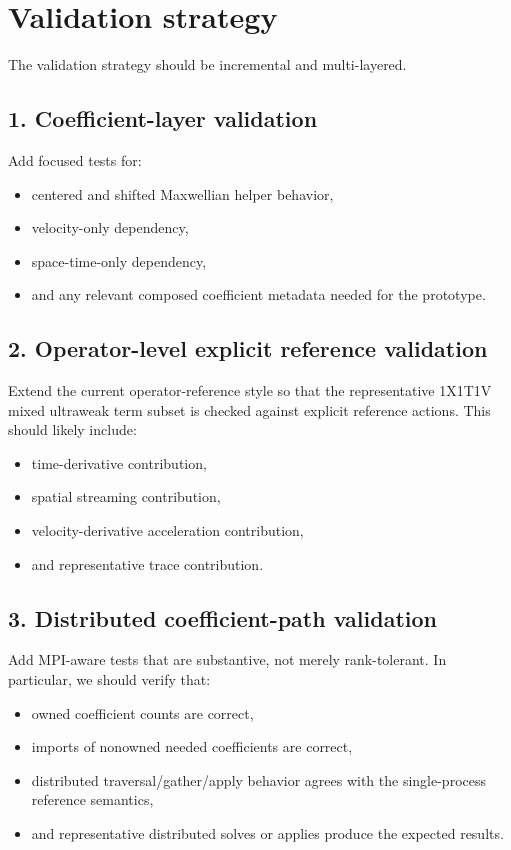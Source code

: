 \documentclass[11pt]{article}
\begin{document}
\section{Validation strategy}

The validation strategy should be incremental and multi-layered.

\subsection{1. Coefficient-layer validation}

Add focused tests for:
\begin{itemize}[leftmargin=2em]
\item centered and shifted Maxwellian helper behavior,
\item velocity-only dependency,
\item space-time-only dependency,
\item and any relevant composed coefficient metadata needed for the prototype.
\end{itemize}

\subsection{2. Operator-level explicit reference validation}

Extend the current operator-reference style so that the representative 1X1T1V mixed ultraweak term subset is checked against explicit reference actions. This should likely include:
\begin{itemize}[leftmargin=2em]
\item time-derivative contribution,
\item spatial streaming contribution,
\item velocity-derivative acceleration contribution,
\item and representative trace contribution.
\end{itemize}

\subsection{3. Distributed coefficient-path validation}

Add MPI-aware tests that are substantive, not merely rank-tolerant. In particular, we should verify that:
\begin{itemize}[leftmargin=2em]
\item owned coefficient counts are correct,
\item imports of nonowned needed coefficients are correct,
\item distributed traversal/gather/apply behavior agrees with the single-process reference semantics,
\item and representative distributed solves or applies produce the expected results.
\end{itemize}
\end{document}
